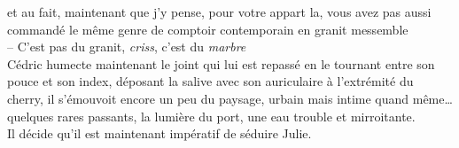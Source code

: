 \textelp{} et au fait, maintenant que j'y pense, pour votre appart la, vous
avez pas aussi commandé le même genre de comptoir contemporain en granit
messemble\\
-- C'est pas du granit, \emph{criss}, c'est du \emph{marbre}\\

Cédric humecte maintenant le joint qui lui est repassé en le tournant entre son
pouce et son index, déposant la salive avec son auriculaire à l'extrémité du
cherry, il s'émouvoit encore un peu du paysage, urbain mais intime quand
même\ldots quelques rares passants, la lumière du port, une eau trouble et
mirroitante.\\ Il décide qu'il est maintenant impératif de séduire Julie.


